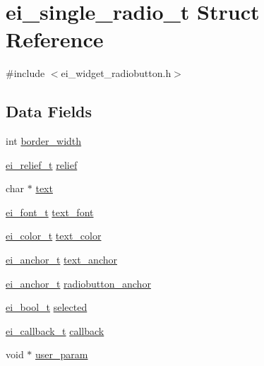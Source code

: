 \hypertarget{structei__single__radio__t}{\section{ei\-\_\-single\-\_\-radio\-\_\-t Struct Reference}
\label{structei__single__radio__t}
}


{\ttfamily \#include $<$ei\-\_\-widget\-\_\-radiobutton.\-h$>$}

\subsection*{Data Fields}
\begin{DoxyCompactItemize}
\item 
int \hyperlink{structei__single__radio__t_a7b3fd49579613685296082126c11fb97}{border\-\_\-width}
\item 
\hyperlink{ei__types_8h_aa79a32b1d8ece0e44cfa394e870b270b}{ei\-\_\-relief\-\_\-t} \hyperlink{structei__single__radio__t_a6a4c4ec006330cc8a5a5f66b5902d73b}{relief}
\item 
char $\ast$ \hyperlink{structei__single__radio__t_ad4802114cca4e3b872e8be371bc10b16}{text}
\item 
\hyperlink{ei__types_8h_a22c8198e4d641e4bc67bb17f9c6bcda7}{ei\-\_\-font\-\_\-t} \hyperlink{structei__single__radio__t_a7b60d4347f0149a0f61c5fe07f5e87ed}{text\-\_\-font}
\item 
\hyperlink{structei__color__t}{ei\-\_\-color\-\_\-t} \hyperlink{structei__single__radio__t_a0db2cd323d73597028d282a2aa52bc96}{text\-\_\-color}
\item 
\hyperlink{ei__types_8h_a3852c963af609d31d7cfcff79c4c8450}{ei\-\_\-anchor\-\_\-t} \hyperlink{structei__single__radio__t_a78abf8d0b50aa886fdb07e9aa3ba0974}{text\-\_\-anchor}
\item 
\hyperlink{ei__types_8h_a3852c963af609d31d7cfcff79c4c8450}{ei\-\_\-anchor\-\_\-t} \hyperlink{structei__single__radio__t_a0e9f12f5902eea1159227041cef2a4d4}{radiobutton\-\_\-anchor}
\item 
\hyperlink{ei__types_8h_a383b9af13bd6a0a893096ead3c4d8e28}{ei\-\_\-bool\-\_\-t} \hyperlink{structei__single__radio__t_a93972e22a3c6f484583b1187c0a2c2b9}{selected}
\item 
\hyperlink{ei__widget_8h_a52cc2158a16cbba536b8e25d2a5da712}{ei\-\_\-callback\-\_\-t} \hyperlink{structei__single__radio__t_a5dd6b1ce68402f19b9133fd99b893dca}{callback}
\item 
void $\ast$ \hyperlink{structei__single__radio__t_a84e5f97ef7e32d46cd6f9540a46dce4a}{user\-\_\-param}
\end{DoxyCompactItemize}


